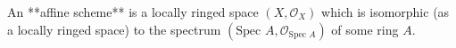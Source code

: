An **affine scheme** is a locally ringed space $(X, \mathcal{O}_X)$ which is isomorphic (as a locally ringed space) to the spectrum $(\text{Spec } A, \mathcal{O}_{\text{Spec } A})$ of some ring $A$.
